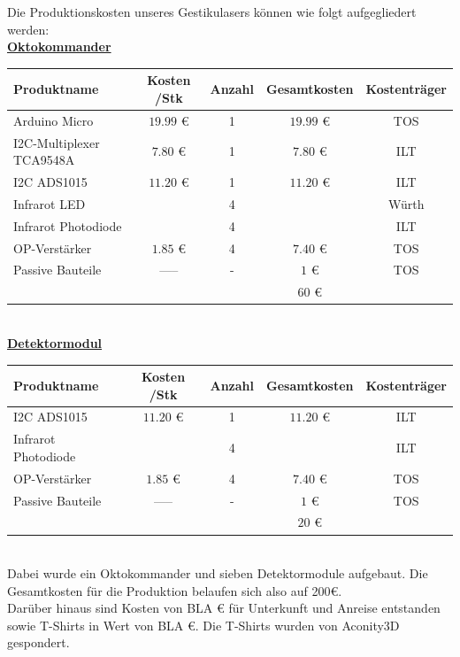 Die Produktionskosten unseres Gestikulasers können wie folgt aufgegliedert werden:\\

\large{\underline{\textbf{Oktokommander}}} \\ 

\begin{tabularx}{\textwidth}{p{3.5cm} | c c c c}

Produktname 			& Kosten /Stk 		& Anzahl & Gesamtkosten    & Kostenträger \\ \hline
Arduino Micro 			& $19.99$ \euro{}   &   1    & $19.99$ \euro{} & TOS 	\\ [2mm]
I2C-Multiplexer TCA9548A& $7.80$ \euro{}    &   1    & $7.80$ \euro{}  & ILT    \\ [8mm]
I2C ADS1015				& $11.20$ \euro{}   &   1    & $11.20$ \euro{} & ILT    \\ [2mm]
Infrarot LED    		&					&   4    &				   & Würth  \\ [2mm]
Infrarot Photodiode 	&					&   4    &                 & ILT	\\ [8mm] 
OP-Verstärker    		& $1.85$ \euro{}    &	4    & $7.40$ \euro{}  & TOS    \\ [2mm]
Passive Bauteile    	&	-----  	        &	-	 &	$1$ \euro{}	   & TOS    \\ [2mm]\hline
						&					&		 & $  60  $	\euro{}&

\end{tabularx}\\

\large{\underline{\textbf{Detektormodul}}} \\ 

\begin{tabularx}{\textwidth}{p{3.5cm} | c c c c}

Produktname 			& Kosten /Stk 		& Anzahl & Gesamtkosten    & Kostenträger \\ \hline
I2C ADS1015				& $11.20$ \euro{}   &   1    & $11.20$ \euro{} & ILT    \\ [2mm]
Infrarot Photodiode 	&					&   4    &                 & ILT	\\ [8mm]
OP-Verstärker    		& $1.85$ \euro{}    &	4    & $7.40$ \euro{}  & TOS    \\ [2mm]
Passive Bauteile    	&	-----  	        &	-	 &	$1$ \euro{}	   & TOS    \\ [2mm]\hline
						&					&		 & $  20  $	\euro{}&
					
\end{tabularx} \\

Dabei wurde ein Oktokommander und sieben Detektormodule aufgebaut. Die Gesamtkosten für die Produktion belaufen sich also auf 200€.\\

Darüber hinaus sind Kosten von BLA \euro{} für Unterkunft und Anreise entstanden sowie T-Shirts in Wert von BLA \euro{}. Die T-Shirts wurden von Aconity3D gespondert.